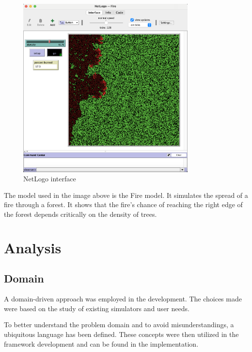 \documentclass[12pt,a4paper,openright,twoside]{book}
\begin{document}
\begin{figure}[h]
  \centering
  \includegraphics[width=0.8\textwidth]{figures/NetLogo-interface.png}
  \caption{NetLogo interface}
\end{figure}

The model used in the image above is the Fire model.
It simulates the spread of a fire through a forest. It shows that the fire's chance of reaching the right edge
of the forest depends critically on the density of trees.

\chapter{Analysis}

\section{Domain}

A domain-driven approach was employed in the development. The choices made were based on the study of existing simulators and user needs.

To better understand the problem domain and to avoid misunderstandings, a ubiquitous language has been defined.
These concepts were then utilized in the framework development and can be found in the implementation.
\end{document}
